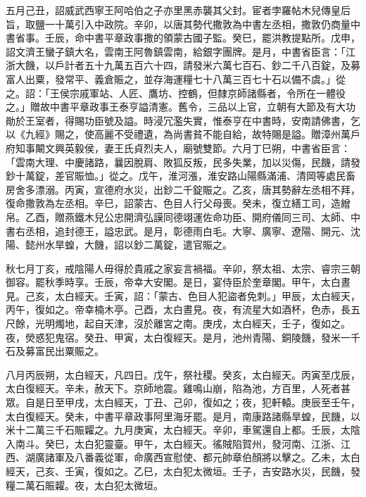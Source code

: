 \begin{pinyinscope}
 五月己丑，詔威武西寧王阿哈伯之子亦里黑赤襲其父封。宦者孛羅帖木兒傳皇后旨，取鹽一十萬引入中政院。辛卯，以唐其勢代撒敦為中書左丞相，撒敦仍商量中書省事。壬辰，命中書平章政事撒的領蒙古國子監。癸巳，罷洪教提點所。戊申，詔文濟王蠻子鎮大名，雲南王阿魯鎮雲南，給銀字團牌。是月，中書省臣言：「江浙大饑，以戶計者五十九萬五百六十四，請發米六萬七百石、鈔二千八百錠，及募富人出粟，發常平、義倉賑之，並存海運糧七十八萬三百七十石以備不虞。」從之。詔：「王侯宗戚軍站、人匠、鷹坊、控鶴，但隸京師諸縣者，令所在一體役之。」贈故中書平章政事王泰亨謚清憲。舊令，三品以上官，立朝有大節及有大功勛於王室者，得賜功臣號及謚。時浸冗濫失實，惟泰亨在中書時，安南請佛書，乞以《九經》賜之，使高麗不受禮遺，為尚書貧不能自給，故特賜是謚。贈漳州萬戶府知事闞文興英毅侯，妻王氏貞烈夫人，廟號雙節。六月丁巳朔，中書省臣言：「雲南大理、中慶諸路，曩因脫肩、敗狐反叛，民多失業，加以災傷，民饑，請發鈔十萬錠，差官賑恤。」從之。戊午，淮河漲，淮安路山陽縣滿浦、清岡等處民畜房舍多漂溺。丙寅，宣德府水災，出鈔二千錠賑之。乙亥，唐其勢辭左丞相不拜，復命撒敦為左丞相。辛巳，詔蒙古、色目人行父母喪。癸未，復立繕工司，造繒帛。乙酉，贈燕鐵木兒公忠開濟弘謨同德翊運佐命功臣、開府儀同三司、太師、中書右丞相，追封德王，謚忠武。是月，彰德雨白毛。大寧、廣寧、遼陽、開元、沈陽、懿州水旱蝗，大饑，詔以鈔二萬錠，遣官賑之。



 秋七月丁亥，戒陰陽人毋得於貴戚之家妄言禍福。辛卯，祭太祖、太宗、睿宗三朝御容。罷秋季時享。壬辰，帝幸大安閣。是日，宴侍臣於奎章閣。甲午，太白晝見。己亥，太白經天。壬寅，詔：「蒙古、色目人犯盜者免刺。」甲辰，太白經天，丙午，復如之。帝幸楠木亭。己酉，太白晝見。夜，有流星大如酒杯，色赤，長五尺餘，光明燭地，起自天津，沒於離宮之南。庚戌，太白經天，壬子，復如之。夜，熒惑犯鬼宿。癸丑、甲寅，太白復經天。是月，池州青陽、銅陵饑，發米一千石及募富民出粟賑之。



 八月丙辰朔，太白經天，凡四日。戊午，祭社稷。癸亥，太白經天。丙寅至戊辰，太白復經天。辛未，赦天下。京師地震。雞鳴山崩，陷為池，方百里，人死者甚眾。自是日至甲戌，太白經天，丁丑、己卯，復如之；夜，犯軒轅。庚辰至壬午，太白復經天。癸未，中書平章政事阿里海牙罷。是月，南康路諸縣旱蝗，民饑，以米十二萬三千石賑糶之。九月庚寅，太白經天。辛卯，車駕還自上都。壬辰，太陰入南斗。癸巳，太白犯靈臺。甲午，太白經天。徭賊陷賀州，發河南、江浙、江西、湖廣諸軍及八番義從軍，命廣西宣慰使、都元帥章伯顏將以擊之。乙未，太白經天，己亥、壬寅，復如之。乙巳，太白犯太微垣。壬子，吉安路水災，民饑，發糧二萬石賑糶。夜，太白犯太微垣。




\end{pinyinscope}
